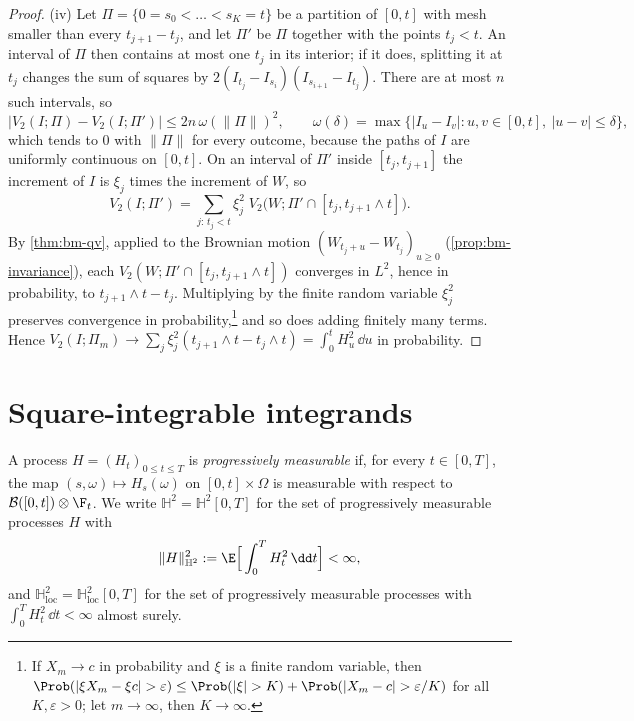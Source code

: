 \begin{proof}
(iv) Let $\Pi=\{0=s_0<\dots<s_K=t\}$ be a partition of $[0,t]$ with mesh smaller than every
$t_{j+1}-t_j$, and let $\Pi'$ be $\Pi$ together with the points $t_j<t$. An interval of $\Pi$
then contains at most one $t_j$ in its interior; if it does, splitting it at $t_j$ changes
the sum of squares by $2(I_{t_j}-I_{s_i})(I_{s_{i+1}}-I_{t_j})$. There are at most $n$ such
intervals, so
\[
  \big|V_2(I;\Pi)-V_2(I;\Pi')\big|\le2n\,\omega(\|\Pi\|)^2,\qquad
  \omega(\delta)=\max\big\{|I_u-I_v|:u,v\in[0,t],\ |u-v|\le\delta\big\},
\]
which tends to $0$ with $\|\Pi\|$ for every outcome, because the paths of $I$ are uniformly
continuous on $[0,t]$. On an interval of $\Pi'$ inside $[t_j,t_{j+1}]$ the increment of $I$
is $\xi_j$ times the increment of $W$, so
\[
  V_2(I;\Pi')=\sum_{j:\,t_j<t}\xi_j^2\;V_2\big(W;\Pi'\cap[t_j,t_{j+1}\wedge t]\big).
\]
By \cref{thm:bm-qv}, applied to the Brownian motion $(W_{t_j+u}-W_{t_j})_{u\ge0}$
(\cref{prop:bm-invariance}), each $V_2(W;\Pi'\cap[t_j,t_{j+1}\wedge t])$ converges in $L^2$,
hence in probability, to $t_{j+1}\wedge t-t_j$. Multiplying by the finite random variable
$\xi_j^2$ preserves convergence in probability,\footnote{If $X_m\to c$ in probability and
$\xi$ is a finite random variable, then
$\Prob(|\xi X_m-\xi c|>\varepsilon)\le\Prob(|\xi|>K)+\Prob(|X_m-c|>\varepsilon/K)$ for all
$K,\varepsilon>0$; let $m\to\infty$, then $K\to\infty$.} and so does adding finitely many
terms. Hence $V_2(I;\Pi_m)\to\sum_j\xi_j^2(t_{j+1}\wedge t-t_j\wedge t)=\int_0^tH_u^2\,\dd u$
in probability.
\end{proof}

\section{Square-integrable integrands}\label{sec:ito-h2}

\begin{definition}\label{def:ito-h2}
A process $H=(H_t)_{0\le t\le T}$ is \emph{progressively measurable} if, for every
$t\in[0,T]$, the map $(s,\omega)\mapsto H_s(\omega)$ on $[0,t]\times\Omega$ is measurable with
respect to $\mathcal B([0,t])\otimes\F_t$. We write $\mathbb H^2=\mathbb H^2[0,T]$ for the set
of progressively measurable processes $H$ with
\[
  \|H\|_{\mathbb H^2}^2:=\E\Big[\int_0^TH_t^2\,\dd t\Big]<\infty ,
\]
and $\mathbb H^2_{\mathrm{loc}}=\mathbb H^2_{\mathrm{loc}}[0,T]$ for the set of progressively
measurable processes with $\int_0^TH_t^2\,\dd t<\infty$ almost surely.
\end{definition}

